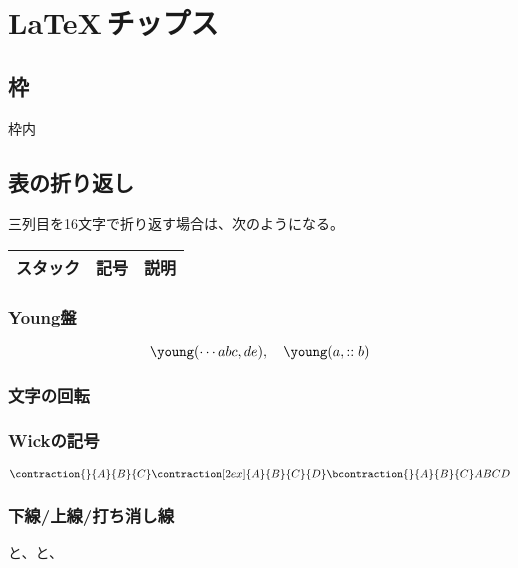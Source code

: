 \section{\LaTeX\,チップス}\label{s1:LaTexチップス} %
\subsection{枠}\label{s2:枠} %
	\begin{center}\begin{boxedminipage}{.9\textwidth}
	枠内
	\end{boxedminipage}\end{center}
\subsection{表の折り返し}\label{s2:表の折り返し} %
	三列目を16文字で折り返す場合は、次のようになる。
	\begin{table}[htbp] %
		\begin{center}\begin{tabular}{ccp{}} \hline
			スタック & 記号 & 説明 \\ \hline
		\end{tabular}\end{center}
	\end{table} %
\subsubsection{Young盤}\label{s2:Young盤} %
	$$
	\young(\cdots abc, de)
	,\quad \young(\hfil\hfil a, ::b)
	$$
\subsubsection{文字の回転}\label{s2:文字の回転} %
\subsubsection{Wickの記号}\label{s2:Wickの記号} %
	$$
	\contraction{}{A}{B}{C}
	\contraction[2ex]{A}{B}{C}{D}
	\bcontraction{}{A}{B}{C}
	ABCD
	$$
\subsubsection{下線/上線/打ち消し線}\label{s2:下線/上線/打ち消し線} %
	と、と、
